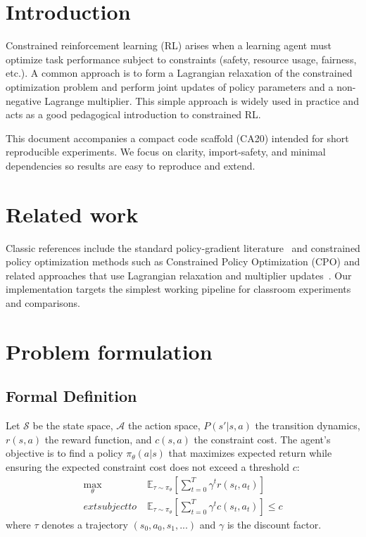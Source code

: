 \section{Introduction}
Constrained reinforcement learning (RL) arises when a learning agent must optimize task performance subject to constraints (safety, resource usage, fairness, etc.). A common approach is to form a Lagrangian relaxation of the constrained optimization problem and perform joint updates of policy parameters and a non-negative Lagrange multiplier. This simple approach is widely used in practice and acts as a good pedagogical introduction to constrained RL.

This document accompanies a compact code scaffold (CA20) intended for short reproducible experiments. We focus on clarity, import-safety, and minimal dependencies so results are easy to reproduce and extend.

\section{Related work}
Classic references include the standard policy-gradient literature~\cite{sutton2018reinforcement,schulman2015trust} and constrained policy optimization methods such as Constrained Policy Optimization (CPO) and related approaches that use Lagrangian relaxation and multiplier updates~\cite{achiam2017constrained}. Our implementation targets the simplest working pipeline for classroom experiments and comparisons.

\section{Problem formulation}
\subsection{Formal Definition}
Let $\mathcal{S}$ be the state space, $\mathcal{A}$ the action space, $P(s'|s,a)$ the transition dynamics, $r(s,a)$ the reward function, and $c(s,a)$ the constraint cost. The agent's objective is to find a policy $\pi_\theta(a|s)$ that maximizes expected return while ensuring the expected constraint cost does not exceed a threshold $c$:
\begin{align}
  \max_{\theta} \; & \mathbb{E}_{\tau\sim\pi_\theta}\left[\sum_{t=0}^T \gamma^t r(s_t,a_t)\right] \\
  	ext{subject to} \; & \mathbb{E}_{\tau\sim\pi_\theta}\left[\sum_{t=0}^T \gamma^t c(s_t,a_t)\right] \leq c
\end{align}
where $\tau$ denotes a trajectory $(s_0,a_0,s_1,...)$ and $\gamma$ is the discount factor.


